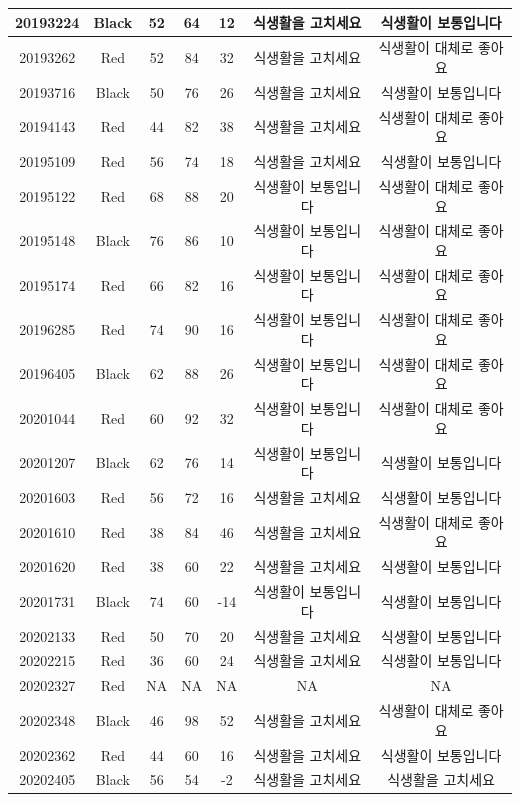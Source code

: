 \documentclass[
]{book}
\begin{document}
\begin{tabular}{c|c|c|c|c|c|c}
\hline
20193224 & Black & 52 & 64 & 12 & 식생활을 고치세요 & 식생활이 보통입니다\\
\hline
20193262 & Red & 52 & 84 & 32 & 식생활을 고치세요 & 식생활이 대체로 좋아요\\
\hline
20193716 & Black & 50 & 76 & 26 & 식생활을 고치세요 & 식생활이 보통입니다\\
\hline
20194143 & Red & 44 & 82 & 38 & 식생활을 고치세요 & 식생활이 대체로 좋아요\\
\hline
20195109 & Red & 56 & 74 & 18 & 식생활을 고치세요 & 식생활이 보통입니다\\
\hline
20195122 & Red & 68 & 88 & 20 & 식생활이 보통입니다 & 식생활이 대체로 좋아요\\
\hline
20195148 & Black & 76 & 86 & 10 & 식생활이 보통입니다 & 식생활이 대체로 좋아요\\
\hline
20195174 & Red & 66 & 82 & 16 & 식생활이 보통입니다 & 식생활이 대체로 좋아요\\
\hline
20196285 & Red & 74 & 90 & 16 & 식생활이 보통입니다 & 식생활이 대체로 좋아요\\
\hline
20196405 & Black & 62 & 88 & 26 & 식생활이 보통입니다 & 식생활이 대체로 좋아요\\
\hline
20201044 & Red & 60 & 92 & 32 & 식생활이 보통입니다 & 식생활이 대체로 좋아요\\
\hline
20201207 & Black & 62 & 76 & 14 & 식생활이 보통입니다 & 식생활이 보통입니다\\
\hline
20201603 & Red & 56 & 72 & 16 & 식생활을 고치세요 & 식생활이 보통입니다\\
\hline
20201610 & Red & 38 & 84 & 46 & 식생활을 고치세요 & 식생활이 대체로 좋아요\\
\hline
20201620 & Red & 38 & 60 & 22 & 식생활을 고치세요 & 식생활이 보통입니다\\
\hline
20201731 & Black & 74 & 60 & -14 & 식생활이 보통입니다 & 식생활이 보통입니다\\
\hline
20202133 & Red & 50 & 70 & 20 & 식생활을 고치세요 & 식생활이 보통입니다\\
\hline
20202215 & Red & 36 & 60 & 24 & 식생활을 고치세요 & 식생활이 보통입니다\\
\hline
20202327 & Red & NA & NA & NA & NA & NA\\
\hline
20202348 & Black & 46 & 98 & 52 & 식생활을 고치세요 & 식생활이 대체로 좋아요\\
\hline
20202362 & Red & 44 & 60 & 16 & 식생활을 고치세요 & 식생활이 보통입니다\\
\hline
20202405 & Black & 56 & 54 & -2 & 식생활을 고치세요 & 식생활을 고치세요\\

\end{tabular}
\end{document}
